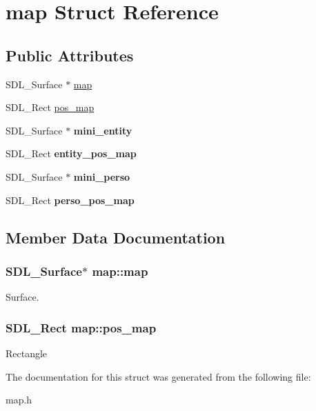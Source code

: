 \hypertarget{structmap}{}\section{map Struct Reference}
\label{structmap}
\subsection*{Public Attributes}
\begin{DoxyCompactItemize}
\item 
S\+D\+L\+\_\+\+Surface $\ast$ \hyperlink{structmap_a32daf60eeab6910e405dc049350b1e9c}{map}
\item 
S\+D\+L\+\_\+\+Rect \hyperlink{structmap_a892e2b0bcb168e8a85bd000b1bda0611}{pos\+\_\+map}
\item 
S\+D\+L\+\_\+\+Surface $\ast$ {\bfseries mini\+\_\+entity}\hypertarget{structmap_af5cb6ef5d8d995a8441e8bfc8fd5c862}{}\label{structmap_af5cb6ef5d8d995a8441e8bfc8fd5c862}

\item 
S\+D\+L\+\_\+\+Rect {\bfseries entity\+\_\+pos\+\_\+map}\hypertarget{structmap_acc2166f6c1dcbc1d8bb9a389b5bfb578}{}\label{structmap_acc2166f6c1dcbc1d8bb9a389b5bfb578}

\item 
S\+D\+L\+\_\+\+Surface $\ast$ {\bfseries mini\+\_\+perso}\hypertarget{structmap_ad5f6a0f500cd8ef220867a7821223897}{}\label{structmap_ad5f6a0f500cd8ef220867a7821223897}

\item 
S\+D\+L\+\_\+\+Rect {\bfseries perso\+\_\+pos\+\_\+map}\hypertarget{structmap_a214838f7c4a02b8148a39fbcb013282a}{}\label{structmap_a214838f7c4a02b8148a39fbcb013282a}

\end{DoxyCompactItemize}


\subsection{Member Data Documentation}
\subsubsection[{\texorpdfstring{map}{map}}]{\setlength{\rightskip}{0pt plus 5cm}S\+D\+L\+\_\+\+Surface$\ast$ map\+::map}\hypertarget{structmap_a32daf60eeab6910e405dc049350b1e9c}{}\label{structmap_a32daf60eeab6910e405dc049350b1e9c}
Surface. 
\subsubsection[{\texorpdfstring{pos\+\_\+map}{pos_map}}]{\setlength{\rightskip}{0pt plus 5cm}S\+D\+L\+\_\+\+Rect map\+::pos\+\_\+map}\hypertarget{structmap_a892e2b0bcb168e8a85bd000b1bda0611}{}\label{structmap_a892e2b0bcb168e8a85bd000b1bda0611}
Rectangle 

The documentation for this struct was generated from the following file\+:\begin{DoxyCompactItemize}
\item 
map.\+h\end{DoxyCompactItemize}
